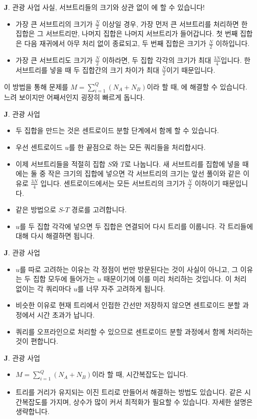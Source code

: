 \begin{frame}{\textbf{J}. 관광 사업}
    사실, 서브트리들의 크기와 상관 없이 에 할 수 있습니다!
    \begin{itemize}
        \item 가장 큰 서브트리의 크기가 $\frac{N}{2}$ 이상일 경우, 가장 먼저 큰 서브트리를 처리하면 한 집합은 그 서브트리만, 나머지 집합은 나머지 서브트리가 들어갑니다. 첫 번째 집합은 다음 재귀에서 아무 처리 없이 종료되고, 두 번째 집합은 크기가 $\frac{N}{2}$ 이하입니다.
        \item 가장 큰 서브트리도 크기가 $\frac{N}{2}$ 이하라면, 두 집합 각각의 크기가 최대 $\frac{3N}{4}$입니다. 한 서브트리를 넣을 때 두 집합간의 크기 차이가 최대 $\frac{N}{2}$이기 때문입니다.
    \end{itemize}
    이 방법을 통해 문제를 $M=\sum_{i=1}^{Q} (N_A+N_B)$이라 할 때, 에 해결할 수 있습니다. 느려 보이지만 어째서인지 굉장히 빠르게 돕니다. 
\end{frame}
\begin{frame}{\textbf{J}. 관광 사업}
    \begin{itemize}
        \item 두 집합을 만드는 것은 센트로이드 분할 단계에서 함께 할 수 있습니다.
        \item 우선 센트로이드 $u$를 한 끝점으로 하는 모든 쿼리들을 처리합시다.
        \item 이제 서브트리들을 적절히 집합 $S$와 $T$로 나눕니다. 새 서브트리를 집합에 넣을 때에는 둘 중 작은 크기의 집합에 넣으면 각 서브트리의 크기는 앞선 풀이와 같은 이유로 $\frac{3N}{4}$ 입니다. 센트로이드에서는 모든 서브트리의 크기가 $\frac{N}{2}$ 이하이기 때문입니다.
        \item 같은 방법으로 $S$-$T$ 경로를 고려합니다.
        \item $u$를 두 집합 각각에 넣으면 두 집합은 연결되어 다시 트리를 이룹니다. 각 트리들에 대해 다시 해결하면 됩니다.
    \end{itemize}
\end{frame}
\begin{frame}{\textbf{J}. 관광 사업}
    \begin{itemize}
        \item $u$를 따로 고려하는 이유는 각 정점이 번만 방문된다는 것이 사실이 아니고, 그 이유는 두 집합 모두에 들어가는 $u$ 때문이기에 이를 미리 처리하는 것입니다. 이 처리 없이는 각 쿼리마다 $u$를 너무 자주 고려하게 됩니다.
        \item 비슷한 이유로 현재 트리에서 인접한 간선만 저장하지 않으면 센트로이드 분할 과정에서 시간 초과가 납니다.
        \item 쿼리를 오프라인으로 처리할 수 있으므로 센트로이드 분할 과정에서 함께 처리하는 것이 편합니다.
    \end{itemize}
\end{frame}
\begin{frame}{\textbf{J}. 관광 사업}
    \begin{itemize}
        \item $M=\sum_{i=1}^{Q} (N_A+N_B)$이라 할 때, 시간복잡도는  입니다.
        \item 트리를 거리가 유지되는 이진 트리로 만들어서 해결하는 방법도 있습니다. 같은 시간복잡도를 가지며, 상수가 많이 커서 최적화가 필요할 수 있습니다. 자세한 설명은 생략합니다.
    \end{itemize}
\end{frame}